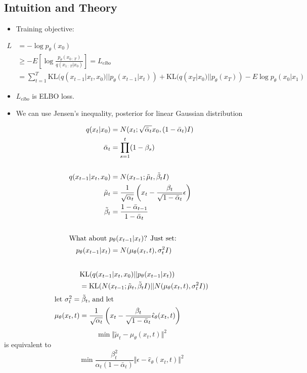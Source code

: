 \documentclass[10pt]{article}
\begin{document}
\subsection*{Intuition and Theory}
\begin{itemize}
	\item Training objective:
\end{itemize}
\begin{align*}
    L &= -\log p_\theta(x_0) \\
    &\geq -E \left[\log \frac{p_\theta(x_{0 \::\: T})}{q(x_{1 \::\: T} | x_0)}\right] = L_{elbo} \\
    &= \sum_{t = 1}^T \text{KL}(q(x_{t - 1} | x_t, x_0) || p_\theta(x_{t - 1} | x_t)) + \text{KL}(q(x_T | x_0) || p_\theta(x_T)) - E \log p_\theta(x_0 | x_1)
\end{align*}
\begin{itemize}
	\item $L_{elbo}$ is ELBO loss. 
	\item We can use Jensen's inequality, posterior for linear Gaussian distribution
\end{itemize}
\begin{align*}
    q(x_t | x_0) &= N(x_t; \sqrt{\bar{\alpha}_t} x_0, (1 - \bar{\alpha}_t)I) \\
    \bar{\alpha}_t &= \prod_{s = 1}^t (1 - \beta_s) \\
    & \\
    q(x_{t - 1} | x_t, x_0) &= N(x_{t - 1}; \tilde{\mu}_t, \tilde{\beta}_t I) \\
    \tilde{\mu}_t &= \frac{1}{\sqrt{\alpha_t}} \left(x_t - \frac{\beta_t}{\sqrt{1 - \bar{\alpha}_t}} \epsilon\right) \\
    \tilde{\beta}_t &= \frac{1 - \bar{\alpha}_{t - 1}}{1 - \bar{\alpha}_t} \\
    & \\
    \intertext{What about $p_\theta(x_{t - 1} | x_t)$?  Just set:}
    p_\theta(x_{t - 1} | x_t) &= N(\mu_\theta(x_t, t), \sigma_t^2 I)\\\\
\end{align*}
\begin{align*}
    &\text{KL}(q(x_{t - 1} | x_t, x_0) || p_\theta(x_{t - 1} | x_t)) \\
    &= \text{KL}(N(x_{t - 1}; \tilde{\mu}_t, \tilde{\beta}_t I) || N(\mu_\theta(x_t, t), \sigma_t^2 I)) \\
    \intertext{let $\sigma_t^2 = \tilde{\beta}_t$, and let}
    \mu_\theta(x_t, t) &= \frac{1}{\sqrt{\alpha_t}} \left(x_t - \frac{\beta_t}{\sqrt{1 - \bar{\alpha}_t}} \hat{\epsilon}_\theta (x_t, t)\right) \\
\end{align*}
\[\min \Vert \tilde{\mu}_t - \mu_\theta(x_t, t) \Vert^2\]
is equivalent to
\[\min \frac{\beta_t^2}{\alpha_t (1 - \bar{\alpha}_t)} \Vert \epsilon - \hat{\epsilon}_\theta(x_t, t) \Vert^2\]
\end{document}
